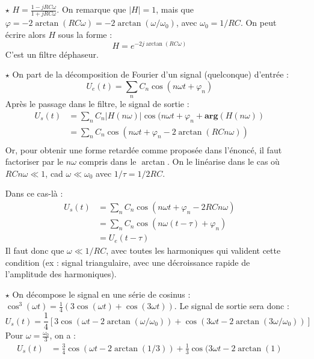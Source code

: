 \documentclass{report}
\begin{document}
\begin{itemize}
	\item[$\star$]
	$H=\frac{1-jRC\omega}{1+jRC\omega}$. On remarque que $\mid H\mid=1$, mais que $\varphi=-2\arctan(RC\omega)=-2\arctan(\omega/\omega_0)$, avec $\omega_0=1/RC$. On peut écrire alors $H$ sous la forme :
	\begin{equation}
		H=e^{-2j\arctan(RC\omega)}
	\end{equation}
C'est un filtre déphaseur.

	\item[$\star$]
	On part de la décomposition de Fourier d'un signal (quelconque) d'entrée :
\begin{equation}
	U_e(t) = \sum_n C_n\cos(n\omega t + \varphi_n)
\end{equation}	
Après le passage dans le filtre, le signal de sortie :	
\begin{equation}
	\begin{array}{lll}
		U_s(t) & = \sum_n C_n|H(n\omega)|\cos(n\omega t + \varphi_n + \mathbf{arg}(H(n\omega)) \\

		 & = \sum_n C_n\cos(n\omega t + \varphi_n -2\arctan(RCn\omega)) \\
	\end{array}
\end{equation}			
	Or, pour obtenir une forme retardée comme proposée dans l'énoncé, il faut factoriser par le $n\omega$ compris dans le $\arctan$. On le linéarise dans le cas où $RCn\omega\ll1$, cad $\omega\ll\omega_0$ avec $1/\tau=1/2RC$. 
	
	Dans ce cas-là :
\begin{equation}
	\begin{array}{lll}
		U_s(t) & = \sum_n C_n\cos(n\omega t + \varphi_n -2RCn\omega) \\

		 & = \sum_n C_n\cos(n\omega (t-\tau) + \varphi_n) \\
		 &= U_e(t-\tau)
	\end{array}
\end{equation}			
	Il faut donc que $\omega\ll 1/RC$, avec toutes les harmoniques qui valident cette condition (ex : signal triangulaire, avec une décroissance rapide de l'amplitude des harmoniques).
	
	\item[$\star$] On décompose le signal en une série de cosinus : $\cos^3(\omega t)=\frac{1}{4}(3\cos(\omega t) + \cos(3\omega t))$.
	Le signal de sortie sera donc : 
	\begin{equation}
	U_s(t) = \frac{1}{4}\left[ 3\cos(\omega t - 2\arctan(\omega/\omega_0)) + \cos(3\omega t - 2\arctan(3\omega/\omega_0))\right] 
	\end{equation}
	Pour $\omega = \frac{\omega_{0}}{3}$, on a :
\begin{equation}
	\begin{array}{lll}
		U_s(t) & = \frac{3}{4}\cos(\omega t - 2\arctan(1/3)) + \frac{1}{3}\cos(3\omega t - 2\arctan(1) \\


\end{array}
\end{equation}
\end{itemize}
\end{document}
